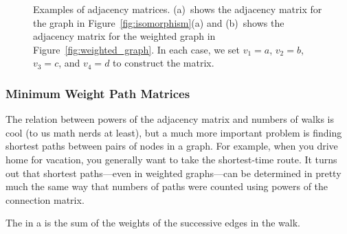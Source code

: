 \begin{editingnotes}
\begin{figure}\redrawntrue
\normalbaselines
{}
\qquad
{}

\caption{Examples of adjacency matrices.  (a)~shows the adjacency
  matrix for the graph in Figure~\ref{fig:isomorphism}(a) and
  (b)~shows the adjacency matrix for the weighted graph in
  Figure~\ref{fig:weighted_graph}.  In each case, we  set $v_1
  = a$, $v_2 = b$, $v_3 = c$, and $v_4 = d$ to construct the matrix.}
\label{fig:adjacency_matrix}
\end{figure}

\subsubsection{Minimum Weight Path  Matrices}
The relation between powers of the adjacency matrix and numbers of
walks is cool (to us math nerds at least),
but a much more important
problem is finding  shortest paths between
pairs of nodes in a graph.  For example, when you drive home for vacation,
you generally want to take the shortest-time route.  It turns out that
shortest paths---even in weighted graphs---can be determined in pretty
much the same way that numbers of paths were counted using powers of the
connection matrix.

\begin{definition}\label{def:5H}
  The   in a  is the sum of the weights of
  the successive edges in the walk.
\end{definition}


\end{editingnotes}
